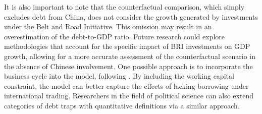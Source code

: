 It is also important to note that the counterfactual comparison, which simply excludes debt from China, does not consider the growth generated by investments under the Belt and Road Initiative. This omission may result in an overestimation of the debt-to-GDP ratio. Future research could explore methodologies that account for the specific impact of BRI investments on GDP growth, allowing for a more accurate assessment of the counterfactual scenario in the absence of Chinese involvement.
One possible approach is to incorporate the business cycle into the model, following \citet{Mendoza-Yue-12}. By including the working capital constraint, the model can better capture the effects of lacking borrowing under international trading.
Researchers in the field of political science can also extend categories of debt traps with quantitative definitions via a similar approach.
